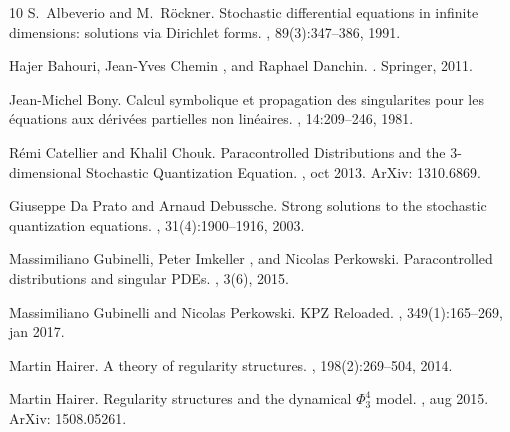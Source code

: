 \begin{appendices}
\end{appendices}

\begin{thebibliography}{10}
  S.~Albeverio  and 
  M.~R{\"o}ckner.{\newblock} Stochastic differential equations in infinite
  dimensions: solutions via Dirichlet forms.{\newblock} , 89(3):347--386, 1991.{\newblock}
  
  Hajer Bahouri, Jean-Yves Chemin , and  Raphael
  Danchin.{\newblock} .{\newblock} Springer, 2011.{\newblock}
  
  Jean-Michel Bony.{\newblock} Calcul symbolique et
  propagation des singularites pour les {\'e}quations aux d{\'e}riv{\'e}es
  partielles non lin{\'e}aires.{\newblock} , 14:209--246, 1981.{\newblock}
  
  R{\'e}mi Catellier  and  Khalil
  Chouk.{\newblock} Paracontrolled Distributions and the 3-dimensional
  Stochastic Quantization Equation.{\newblock} , oct 2013.{\newblock} ArXiv: 1310.6869.{\newblock}
  
  Giuseppe Da Prato  and  Arnaud
  Debussche.{\newblock} Strong solutions to the stochastic quantization
  equations.{\newblock} ,
  31(4):1900--1916, 2003.{\newblock}
  
  Massimiliano Gubinelli, Peter
  Imkeller , and  Nicolas Perkowski.{\newblock} Paracontrolled distributions
  and singular PDEs.{\newblock} , 3(6),
  2015.{\newblock}
  
  Massimiliano Gubinelli  and  Nicolas
  Perkowski.{\newblock} KPZ Reloaded.{\newblock} , 349(1):165--269, jan 2017.{\newblock}
  
  Martin Hairer.{\newblock} A theory of
  regularity structures.{\newblock} ,
  198(2):269--504, 2014.{\newblock}
  
  Martin Hairer.{\newblock} Regularity
  structures and the dynamical $\Phi^4_3$ model.{\newblock}
  , aug 2015.{\newblock} ArXiv:
  1508.05261.{\newblock}
  

\end{thebibliography}
